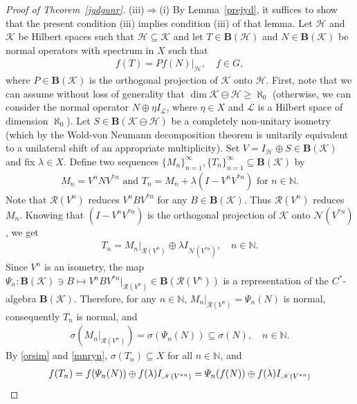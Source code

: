 \documentclass[reqno]{amsproc}
\numberwithin{equation}{section}
\theoremstyle{remark}
\newcommand*{\hh}{\mathcal{H}}
\newcommand*{\kk}{\mathcal{K}}
\newcommand*{\natu}{\mathbb{N}}
\newcommand*{\nul}{\mathscr{N}}
\theoremstyle{definition}
\newcommand*{\Ge}{\geqslant}
\newcommand*{\ran}{\mathscr{R}}
\newcommand*{\ogr}{\boldsymbol{B}}
\begin{document}
\begin{proof}[Proof of Theorem~\ref{jydgunr}]
(iii)$\Rightarrow$(i) By Lemma~\ref{prejyd}, it
suffices to show that the present condition (iii)
implies condition (iii) of that lemma. Let $\hh$ and
$\kk$ be Hilbert spaces such that $\hh\subseteq \kk$
and let $T\in \ogr(\hh)$ and $N\in \ogr(\kk)$ be
normal operators with spectrum in $X$ such that
   \begin{align}  \label{ftpfs}
f(T) = Pf(N)|_{\hh}, \quad f\in G,
   \end{align}
where $P\in \ogr(\kk)$ is the orthogonal projection of
$\kk$ onto $\hh$. First, note that we can assume
without loss of generality that $\dim \kk \ominus
\hh\Ge \aleph_0$ (otherwise, we can consider the
normal operator $N \oplus \eta I_{\mathcal{L}}$, where
$\eta\in X$ and $\mathcal{L}$ is a Hilbert space of
dimension $\aleph_0$). Let $S\in \ogr(\kk \ominus
\hh)$ be a completely non-unitary isometry (which by
the Wold-von Neumann decomposition theorem is
unitarily equivalent to a unilateral shift of an
appropriate multiplicity). Set $V=I_{\hh} \oplus S \in
\ogr(\kk)$ and fix $\lambda\in X$. Define two
sequences $\{M_n\}_{n=1}^{\infty},
\{T_n\}_{n=1}^{\infty}\subseteq \ogr(\kk)$ by
   \begin{align} \label{mdnvuk}
M_n=V^nNV^{*n} \text{ and } T_n = M_n + \lambda
(I-V^nV^{*n}) \text{ for } n\in \natu.
   \end{align}
Note that $\ran(V^n)$ reduces $V^n B V^{*n}$ for any
$B\in \ogr(\kk)$. Thus $\ran(V^n)$ reduces $M_n$.
Knowing that $(I-V^nV^{*n})$ is the orthogonal
projection of $\kk$ onto $\nul(V^{*n})$, we get
   \begin{align} \label{orsim}
T_n = M_n|_{\ran(V^n)} \oplus \lambda
I_{\nul(V^{*n})}, \quad n\in \natu.
   \end{align}
Since $V^n$ is an isometry, the map $\varPsi_n\colon
\ogr(\kk) \ni B \mapsto V^nBV^{*n}|_{\ran(V^n)}\in
\ogr(\ran(V^n))$ is a representation of the
$C^*$-algebra $\ogr(\kk)$. Therefore, for any $n\in
\natu$, $M_n|_{\ran(V^n)}=\varPsi_n(N)$ is normal,
consequently $T_n$ is normal, and
   \begin{align}  \label{mnryn}
\sigma(M_n|_{\ran(V^n)}) = \sigma(\varPsi_n(N))
\subseteq \sigma(N), \quad n \in \natu.
   \end{align}
By \eqref{orsim} and \eqref{mnryn},
$\sigma(T_n)\subseteq X$ for all $n\in \natu$, and
   \allowdisplaybreaks
   \begin{align} \notag
f(T_n) & = f(\varPsi_n(N)) \oplus f(\lambda)
I_{\nul(V^{*n})} = \varPsi_n(f(N)) \oplus f(\lambda)
I_{\nul(V^{*n})}
   \\ \label{fumv}

\end{align}
\end{proof}
\end{document}
